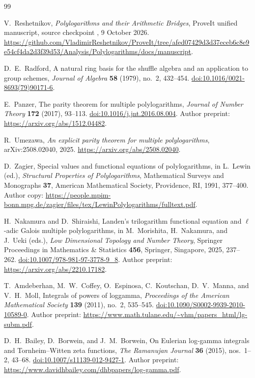 \clearpage
\begin{thebibliography}{99}

V.~Reshetnikov, \emph{Polylogarithms and their Arithmetic Bridges},
ProveIt unified manuscript, source checkpoint
, 9 October 2026.
\url{https://github.com/VladimirReshetnikov/ProveIt/tree/afed07429d3d37eceb6c8e9e54cf4da2d3f39d53/Analysis/Polylogarithms/docs/manuscript}.

D.~E.~Radford, A natural ring basis for the shuffle algebra and an
application to group schemes, \emph{Journal of Algebra} \textbf{58}
(1979), no.~2, 432--454.
\href{https://doi.org/10.1016/0021-8693(79)90171-6}{doi:10.1016/0021-8693(79)90171-6}.

E.~Panzer, The parity theorem for multiple polylogarithms,
\emph{Journal of Number Theory} \textbf{172} (2017), 93--113.
\href{https://doi.org/10.1016/j.jnt.2016.08.004}{doi:10.1016/j.jnt.2016.08.004}.
Author preprint: \url{https://arxiv.org/abs/1512.04482}.

R.~Umezawa, \emph{An explicit parity theorem for multiple polylogarithms},
arXiv:2508.02040, 2025.
\url{https://arxiv.org/abs/2508.02040}.

D.~Zagier, Special values and functional equations of polylogarithms,
in L.~Lewin (ed.), \emph{Structural Properties of Polylogarithms},
Mathematical Surveys and Monographs \textbf{37}, American Mathematical
Society, Providence, RI, 1991, 377--400.
Author copy:
\url{https://people.mpim-bonn.mpg.de/zagier/files/tex/LewinPolylogarithms/fulltext.pdf}.

H.~Nakamura and D.~Shiraishi, Landen's trilogarithm functional equation
and \(\ell\)-adic Galois multiple polylogarithms,
in M.~Morishita, H.~Nakamura, and J.~Ueki (eds.),
\emph{Low Dimensional Topology and Number Theory},
Springer Proceedings in Mathematics \& Statistics \textbf{456},
Springer, Singapore, 2025, 237--262.
\href{https://doi.org/10.1007/978-981-97-3778-9_8}{doi:10.1007/978-981-97-3778-9\_8}.
Author preprint: \url{https://arxiv.org/abs/2210.17182}.

T.~Amdeberhan, M.~W.~Coffey, O.~Espinosa, C.~Koutschan,
D.~V.~Manna, and V.~H.~Moll, Integrals of powers of loggamma,
\emph{Proceedings of the American Mathematical Society}
\textbf{139} (2011), no.~2, 535--545.
\href{https://doi.org/10.1090/S0002-9939-2010-10589-0}{doi:10.1090/S0002-9939-2010-10589-0}.
Author preprint:
\url{https://www.math.tulane.edu/~vhm/papers_html/lg-subm.pdf}.

D.~H.~Bailey, D.~Borwein, and J.~M.~Borwein,
On Eulerian log-gamma integrals and Tornheim--Witten zeta functions,
\emph{The Ramanujan Journal} \textbf{36} (2015), nos.~1--2, 43--68.
\href{https://doi.org/10.1007/s11139-012-9427-1}{doi:10.1007/s11139-012-9427-1}.
Author preprint:
\url{https://www.davidhbailey.com/dhbpapers/log-gamma.pdf}.

\end{thebibliography}
